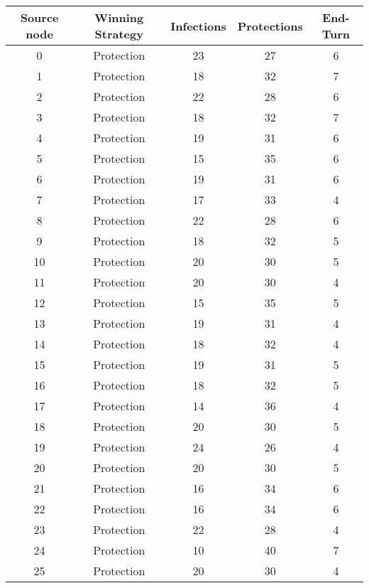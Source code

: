 \documentclass[results.tex]{subfiles}
\begin{document}
\begin{center}
  \begin{tabular}{| c || c | c | c | c |}
    \hline
    {\bfseries Source node} & {\bfseries Winning Strategy} & {\bfseries Infections} & {\bfseries Protections} & {\bfseries End-Turn} \\  %
    \hline\hline
    0 & Protection & 23 & 27 & 6 \\ 
    \hline
    1 & Protection & 18 & 32 & 7 \\ 
    \hline
    2 & Protection & 22 & 28 & 6 \\ 
    \hline
    3 & Protection & 18 & 32 & 7 \\ 
    \hline
    4 & Protection & 19 & 31 & 6 \\ 
    \hline
    5 & Protection & 15 & 35 & 6 \\ 
    \hline
    6 & Protection & 19 & 31 & 6 \\ 
    \hline
    7 & Protection & 17 & 33 & 4 \\ 
    \hline
    8 & Protection & 22 & 28 & 6 \\ 
    \hline
    9 & Protection & 18 & 32 & 5 \\ 
    \hline
    10 & Protection & 20 & 30 & 5 \\ 
    \hline
    11 & Protection & 20 & 30 & 4 \\ 
    \hline
    12 & Protection & 15 & 35 & 5 \\ 
    \hline
    13 & Protection & 19 & 31 & 4 \\ 
    \hline
    14 & Protection & 18 & 32 & 4 \\ 
    \hline
    15 & Protection & 19 & 31 & 5 \\ 
    \hline
    16 & Protection & 18 & 32 & 5 \\ 
    \hline
    17 & Protection & 14 & 36 & 4 \\ 
    \hline
    18 & Protection & 20 & 30 & 5 \\ 
    \hline
    19 & Protection & 24 & 26 & 4 \\ 
    \hline
    20 & Protection & 20 & 30 & 5 \\ 
    \hline
    21 & Protection & 16 & 34 & 6 \\ 
    \hline
    22 & Protection & 16 & 34 & 6 \\ 
    \hline
    23 & Protection & 22 & 28 & 4 \\ 
    \hline
    24 & Protection & 10 & 40 & 7 \\ 
    \hline
    25 & Protection & 20 & 30 & 4 \\ 

\end{tabular}
\end{center}
\end{document}
